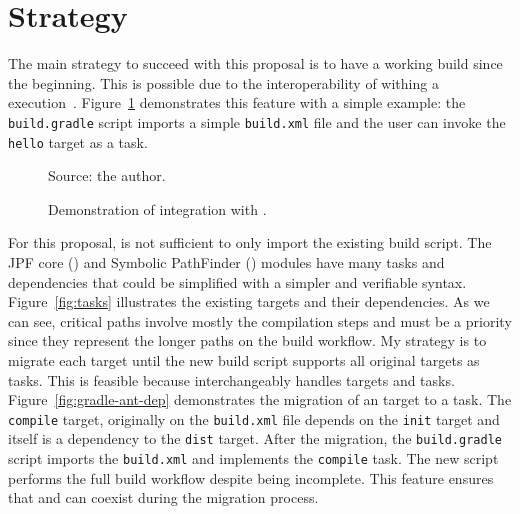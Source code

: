 \documentclass{article}
\begin{document}
\section{Strategy}
\label{sec:plan}

The main strategy to succeed with this proposal is to have a working \gradle{}
build since the beginning.
This is possible due to the interoperability of \ant{} withing a \gradle{}
execution~\cite{page:gradle-ant-support}.
Figure~\ref{fig:gradle-ant-support} demonstrates this feature with a simple
example: the \texttt{build.gradle} script imports a simple \texttt{build.xml}
file and the user can invoke the \texttt{hello} target as a \gradle{} task.

\begin{figure}[h!]
    \centering
    \begin{subfigure}[b]{0.4\textwidth}
        
    \end{subfigure}
    \hfill
    \begin{subfigure}[b]{0.4\textwidth}
        
    \end{subfigure}
    \hfill
    \begin{subfigure}[b]{0.4\textwidth}
        
    \end{subfigure}
    \caption{Demonstration of \ant{} integration with
    \gradle{}.\label{fig:gradle-ant-support}}
    {\scriptsize Source: the author.}
\end{figure}

For this proposal, is not sufficient to only import the existing build script. 
The JPF core (\jpfcore) and Symbolic PathFinder (\jpfsymbc) modules have many
tasks and dependencies that could be simplified with a simpler and verifiable
syntax.
Figure~\ref{fig:tasks} illustrates the existing \ant{} targets and their
dependencies.
As we can see, critical paths involve mostly the compilation steps and must
be a priority since they represent the longer paths on the build workflow.
My strategy is to migrate each \ant{} target until the new build script
supports all original targets as \gradle{} tasks.
This is feasible because \gradle{} interchangeably handles \ant{} targets and
\gradle{} tasks.
Figure~\ref{fig:gradle-ant-dep} demonstrates the migration of an \ant{} target
to a \gradle{} task.
The \texttt{compile} target, originally on the \texttt{build.xml} file depends
on the \texttt{init} target and itself is a dependency to the \texttt{dist}
target.
After the migration, the \texttt{build.gradle} script imports the
\texttt{build.xml} and implements the \texttt{compile} task.
The new \gradle{} script performs the full build workflow despite being
incomplete.
This feature ensures that \ant{} and \gradle{} can coexist during the migration
process.
\end{document}
